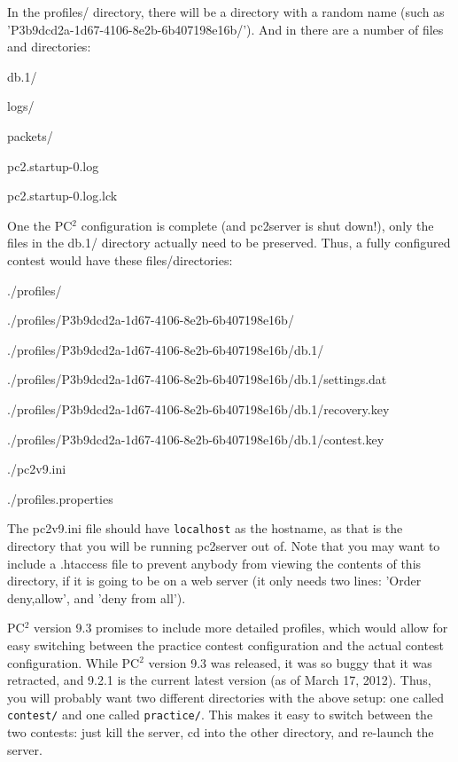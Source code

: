In the profiles/ directory, there will be a directory with a random
name (such as 'P3b9dcd2a-1d67-4106-8e2b-6b407198e16b/').  And in there
are a number of files and directories:

\begin{itemlist}
\item db.1/
\item logs/
\item packets/
\item pc2.startup-0.log
\item pc2.startup-0.log.lck
\end{itemlist}

One the PC$^2$ configuration is complete (and pc2server is shut
down!), only the files in the db.1/ directory actually need to be
preserved.  Thus, a fully configured contest would have these
files/directories:

\begin{itemlist}
\item ./profiles/
\item ./profiles/P3b9dcd2a-1d67-4106-8e2b-6b407198e16b/
\item ./profiles/P3b9dcd2a-1d67-4106-8e2b-6b407198e16b/db.1/
\item ./profiles/P3b9dcd2a-1d67-4106-8e2b-6b407198e16b/db.1/settings.dat
\item ./profiles/P3b9dcd2a-1d67-4106-8e2b-6b407198e16b/db.1/recovery.key
\item ./profiles/P3b9dcd2a-1d67-4106-8e2b-6b407198e16b/db.1/contest.key
\item ./pc2v9.ini
\item ./profiles.properties
\end{itemlist}

The pc2v9.ini file should have {\tt localhost} as the hostname, as
that is the directory that you will be running pc2server out of.  Note
that you may want to include a .htaccess file to prevent anybody from
viewing the contents of this directory, if it is going to be on a web
server (it only needs two lines: 'Order deny,allow', and 'deny from
all').

PC$^2$ version 9.3 promises to include more detailed profiles, which
would allow for easy switching between the practice contest
configuration and the actual contest configuration.  While PC$^2$
version 9.3 was released, it was so buggy that it was retracted, and
9.2.1 is the current latest version (as of March 17, 2012).  Thus, you
will probably want two different directories with the above setup: one
called {\tt contest/} and one called {\tt practice/}.  This makes it
easy to switch between the two contests: just kill the server, cd into
the other directory, and re-launch the server.

